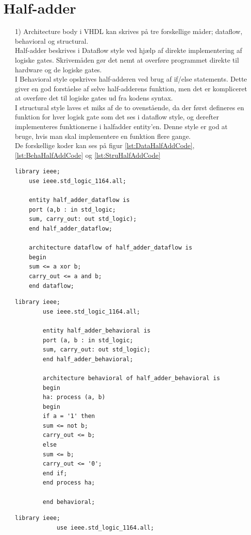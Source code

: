\section{Half-adder}
\begin{enumerate}
	\item[1)]
	Architecture body i VHDL kan skrives på tre forskellige måder; dataflow, behavioral og structural. \\
	Half-adder beskrives i Dataflow style ved hjælp af direkte implementering af logiske gates. Skrivemåden gør det nemt at overføre programmet direkte til hardware og de logiske gates. \\
	I Behavioral style opskrives half-adderen ved brug af if/else statements. Dette giver en god forståelse af selve half-adderens funktion, men det er kompliceret at overføre det til logiske gates ud fra kodens syntax. \\
	I structural style laves et miks af de to ovenstående, da der først defineres en funktion for hver logisk gate som det ses i dataflow style, og derefter implementeres funktionerne i halfadder entity’en. Denne style er god at bruge, hvis man skal implementere en funktion flere gange.\\
	De forskellige koder kan ses på figur \ref{lst:DataHalfAddCode}, \ref{lst:BehaHalfAddCode} og \ref{lst:StruHalfAddCode}
	\begin{lstlisting}[caption={Dataflow half-adder kode},label={lst:DataHalfAddCode}]
	library ieee;
	use ieee.std_logic_1164.all;
	
	entity half_adder_dataflow is
	port (a,b : in std_logic;
	sum, carry_out: out std_logic);
	end half_adder_dataflow;
	
	architecture dataflow of half_adder_dataflow is
	begin
	sum <= a xor b;
	carry_out <= a and b;
	end dataflow;
	\end{lstlisting}
		\begin{lstlisting}[caption={Behavioral style half-adder kode},label={lst:BehaHalfAddCode}]
		library ieee;
		use ieee.std_logic_1164.all;
		
		entity half_adder_behavioral is
		port (a, b : in std_logic;
		sum, carry_out: out std_logic);
		end half_adder_behavioral;
		
		architecture behavioral of half_adder_behavioral is
		begin
		ha: process (a, b)
		begin
		if a = '1' then
		sum <= not b;
		carry_out <= b;
		else
		sum <= b;
		carry_out <= '0';
		end if;
		end process ha;
		
		end behavioral;
		\end{lstlisting}
			\begin{lstlisting}[caption={Structural half-adder kode},label={lst:StruHalfAddCode}]
			library ieee;
			use ieee.std_logic_1164.all;
			

\end{lstlisting}
\end{enumerate}
